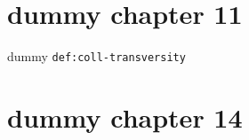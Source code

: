 \clearpage\begingroup\small
\setcounter{chapter}{11}\addtocounter{chapter}{-1}
\chapter{dummy chapter 11}
\begin{definition}\label{def:coll-transversity}dummy \texttt{def:coll-transversity}\end{definition}
\setcounter{chapter}{14}\addtocounter{chapter}{-1}
\chapter{dummy chapter 14}\label{ch:tmd}
\endgroup
